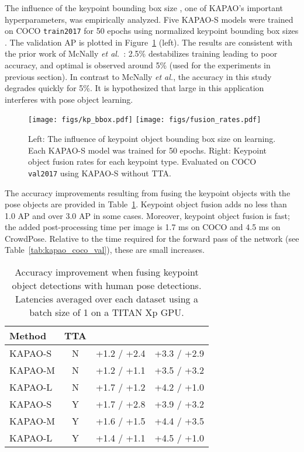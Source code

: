 \documentclass[runningheads]{llncs}
\newcommand{\etal}{\textit{et al.}}
\begin{document}
The influence of the keypoint bounding box size , one of KAPAO's important hyperparameters, was empirically analyzed. Five KAPAO-S models were trained on COCO \texttt{train2017} for 50 epochs using normalized keypoint bounding box sizes  . The validation AP is plotted in Figure~\ref{fig:kapao_kp_bbox_fusion} (left). The results are consistent with the prior work of McNally \etal~\cite{mcnally2021deepdarts}:  2.5\% destabilizes training leading to poor accuracy, and optimal  is observed around 5\% (used for the experiments in previous section). In contrast to McNally \etal, the accuracy in this study degrades quickly for  5\%. It is hypothesized that large  in this application interferes with pose object learning. 

\begin{figure}[t!]
\centering
    \texttt{[image: figs/kp\_bbox.pdf]}
    \texttt{[image: figs/fusion\_rates.pdf]}
\caption{Left: The influence of keypoint object bounding box size on learning. Each KAPAO-S model was trained for 50 epochs. Right: Keypoint object fusion rates for each keypoint type. Evaluated on COCO \texttt{val2017} using KAPAO-S without TTA.}
\label{fig:kapao_kp_bbox_fusion}
\end{figure}

The accuracy improvements resulting from fusing the keypoint objects with the pose objects are provided in Table~\ref{tab:kapao_det_fusion}. Keypoint object fusion adds no less than 1.0 AP and over 3.0 AP in some cases. Moreover, keypoint object fusion is fast; the added post-processing time per image is  1.7 ms on COCO and  4.5 ms on CrowdPose. Relative to the time required for the forward pass of the network (see Table~\ref{tab:kapao_coco_val}), these are small increases.

\begin{table}[t]
\footnotesize
\centering
\begin{tabular}{l|c|c|c}
	\hline
	Method & TTA & \makecell{ Lat. (ms) / AP\CrowdPose \texttt{test})}\\
	\hline
	KAPAO-S & N & +1.2 / +2.4 & +3.3 / +2.9 \\
	KAPAO-M & N & +1.2 / +1.1 & +3.5 / +3.2\\
	KAPAO-L & N & +1.7 / +1.2 & +4.2 / +1.0 \\
    \hline
	KAPAO-S & Y & +1.7 / +2.8 & +3.9 / +3.2 \\
	KAPAO-M & Y & +1.6 / +1.5 & +4.4 / +3.5 \\
	KAPAO-L & Y & +1.4 / +1.1 & +4.5 / +1.0 \\
	\hline
\end{tabular}
\smallskip
\caption[Accuracy improvement resulting from fusing keypoint objects with pose objects.]{Accuracy improvement when fusing keypoint object detections with human pose detections. Latencies averaged over each dataset using a batch size of 1 on a TITAN Xp GPU.}
\label{tab:kapao_det_fusion}
\end{table}
\end{document}
